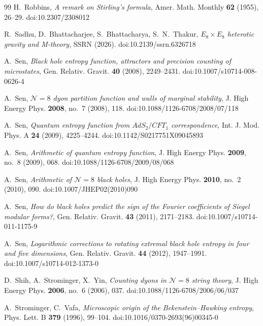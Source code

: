 \documentclass[11pt]{amsart}
\theoremstyle{definition}
\begin{document}
\begin{thebibliography}{99}
 H.~Robbins, \emph{A remark on Stirling's formula}, Amer. Math. Monthly \textbf{62} (1955), 26--29. doi:10.2307/2308012

 R.~Sadhu, D.~Bhattacharjee, S.~Bhattacharya, S.~N.~Thakur, \emph{$E_8\times E_8$ heterotic gravity and M-theory}, SSRN (2026). doi:10.2139/ssrn.6326718

 A.~Sen, \emph{Black hole entropy function, attractors and precision counting of microstates}, Gen. Relativ. Gravit. \textbf{40} (2008), 2249--2431. doi:10.1007/s10714-008-0626-4

 A.~Sen, \emph{$\mathcal N=8$ dyon partition function and walls of marginal stability}, J. High Energy Phys. \textbf{2008}, no.~7 (2008), 118. doi:10.1088/1126-6708/2008/07/118

 A.~Sen, \emph{Quantum entropy function from $AdS_2/CFT_1$ correspondence}, Int. J. Mod. Phys. A \textbf{24} (2009), 4225--4244. doi:10.1142/S0217751X09045893

 A.~Sen, \emph{Arithmetic of quantum entropy function}, J. High Energy Phys. \textbf{2009}, no.~8 (2009), 068. doi:10.1088/1126-6708/2009/08/068

 A.~Sen, \emph{Arithmetic of $\mathcal N=8$ black holes}, J. High Energy Phys. \textbf{2010}, no.~2 (2010), 090. doi:10.1007/JHEP02(2010)090

 A.~Sen, \emph{How do black holes predict the sign of the Fourier coefficients of Siegel modular forms?}, Gen. Relativ. Gravit. \textbf{43} (2011), 2171--2183. doi:10.1007/s10714-011-1175-9

 A.~Sen, \emph{Logarithmic corrections to rotating extremal black hole entropy in four and five dimensions}, Gen. Relativ. Gravit. \textbf{44} (2012), 1947--1991. doi:10.1007/s10714-012-1373-0

 D.~Shih, A.~Strominger, X.~Yin, \emph{Counting dyons in $\mathcal N=8$ string theory}, J. High Energy Phys. \textbf{2006}, no.~6 (2006), 037. doi:10.1088/1126-6708/2006/06/037

 A.~Strominger, C.~Vafa, \emph{Microscopic origin of the Bekenstein--Hawking entropy}, Phys. Lett. B \textbf{379} (1996), 99--104. doi:10.1016/0370-2693(96)00345-0

\end{thebibliography}
\end{document}
